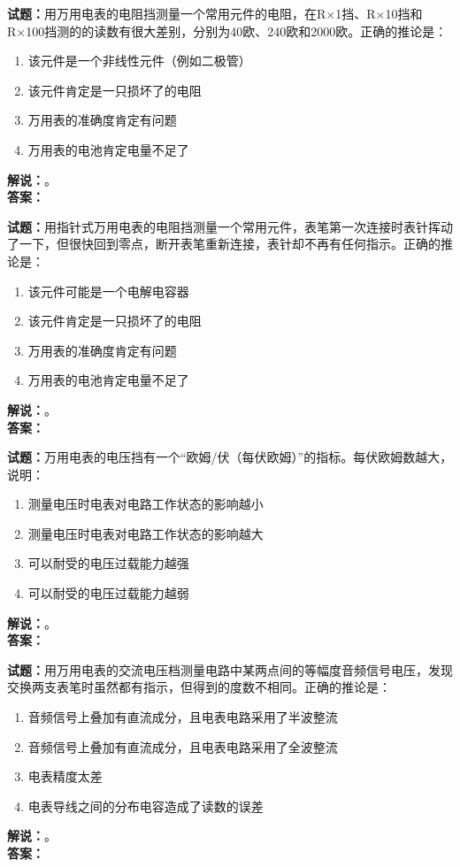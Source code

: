 \documentclass{ctexbook}
\begin{document}
\bigskip




\noindent\textbf{试题：}用万用电表的电阻挡测量一个常用元件的电阻，在R×1挡、R×10挡和R×100挡测的的读数有很大差别，分别为40欧、240欧和2000欧。正确的推论是：
\begin{enumerate}[leftmargin=3em]
\item 该元件是一个非线性元件（例如二极管）
\item 该元件肯定是一只损坏了的电阻
\item 万用表的准确度肯定有问题
\item 万用表的电池肯定电量不足了
\end{enumerate}
\noindent\textbf{解说：}\textbf{}。\\\noindent\textbf{答案：}

\bigskip




\noindent\textbf{试题：}用指针式万用电表的电阻挡测量一个常用元件，表笔第一次连接时表针挥动了一下，但很快回到零点，断开表笔重新连接，表针却不再有任何指示。正确的推论是：
\begin{enumerate}[leftmargin=3em]
\item 该元件可能是一个电解电容器
\item 该元件肯定是一只损坏了的电阻
\item 万用表的准确度肯定有问题
\item 万用表的电池肯定电量不足了
\end{enumerate}
\noindent\textbf{解说：}\textbf{}。\\\noindent\textbf{答案：}

\bigskip




\noindent\textbf{试题：}万用电表的电压挡有一个“欧姆/伏（每伏欧姆）”的指标。每伏欧姆数越大，说明：
\begin{enumerate}[leftmargin=3em]
\item 测量电压时电表对电路工作状态的影响越小
\item 测量电压时电表对电路工作状态的影响越大
\item 可以耐受的电压过载能力越强
\item 可以耐受的电压过载能力越弱
\end{enumerate}
\noindent\textbf{解说：}\textbf{}。\\\noindent\textbf{答案：}

\bigskip




\noindent\textbf{试题：}用万用电表的交流电压档测量电路中某两点间的等幅度音频信号电压，发现交换两支表笔时虽然都有指示，但得到的度数不相同。正确的推论是：
\begin{enumerate}[leftmargin=3em]
\item 音频信号上叠加有直流成分，且电表电路采用了半波整流
\item 音频信号上叠加有直流成分，且电表电路采用了全波整流
\item 电表精度太差
\item 电表导线之间的分布电容造成了读数的误差
\end{enumerate}
\noindent\textbf{解说：}\textbf{}。\\\noindent\textbf{答案：}
\end{document}
